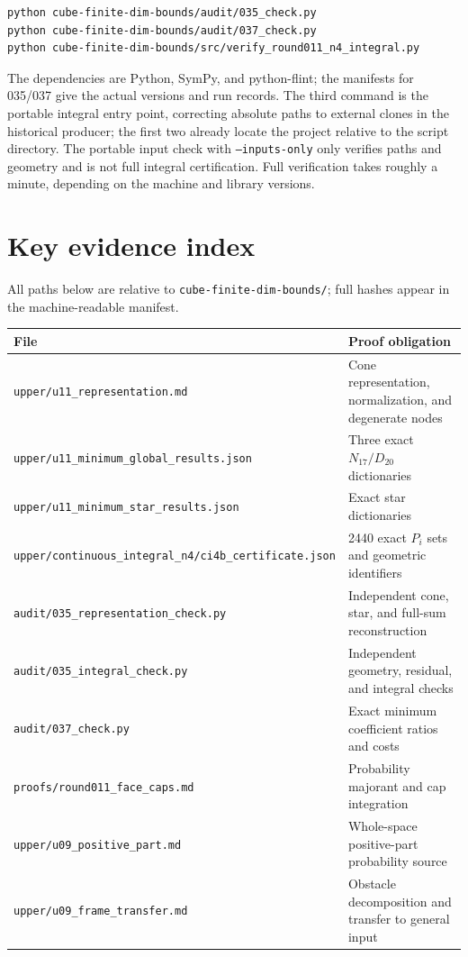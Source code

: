 \documentclass[11pt,a4paper]{article}
\theoremstyle{remark}\newtheorem{remark}[theorem]{Remark}
\newcommand{\1}{\mathbf1}\newcommand{\pos}[1]{(#1)_+}
\begin{document}
\begin{Verbatim}[fontsize=\small]
python cube-finite-dim-bounds/audit/035_check.py
python cube-finite-dim-bounds/audit/037_check.py
python cube-finite-dim-bounds/src/verify_round011_n4_integral.py
\end{Verbatim}
The dependencies are Python, SymPy, and python-flint; the manifests for 035/037 give the actual versions and run records. The third command is the portable integral entry point, correcting absolute paths to external clones in the historical producer; the first two already locate the project relative to the script directory. The portable input check with \texttt{--inputs-only} only verifies paths and geometry and is not full integral certification. Full verification takes roughly a minute, depending on the machine and library versions.

\section{Key evidence index}
All paths below are relative to \texttt{cube-finite-dim-bounds/}; full hashes appear in the machine-readable manifest.
\begin{center}\small
\begin{tabular}{p{.59\linewidth}p{.32\linewidth}}\toprule
File&Proof obligation\\\midrule
\texttt{upper/u11\_representation.md}&Cone representation, normalization, and degenerate nodes\\
\texttt{upper/u11\_minimum\_global\_results.json}&Three exact $N_{17}/D_{20}$ dictionaries\\
\texttt{upper/u11\_minimum\_star\_results.json}&Exact star dictionaries\\
\texttt{upper/continuous\_integral\_n4/ci4b\_certificate.json}&2440 exact $P_i$ sets and geometric identifiers\\
\texttt{audit/035\_representation\_check.py}&Independent cone, star, and full-sum reconstruction\\
\texttt{audit/035\_integral\_check.py}&Independent geometry, residual, and integral checks\\
\texttt{audit/037\_check.py}&Exact minimum coefficient ratios and costs\\
\texttt{proofs/round011\_face\_caps.md}&Probability majorant and cap integration\\
\texttt{upper/u09\_positive\_part.md}&Whole-space positive-part probability source\\
\texttt{upper/u09\_frame\_transfer.md}&Obstacle decomposition and transfer to general input\\\bottomrule
\end{tabular}
\end{center}



\end{document}
